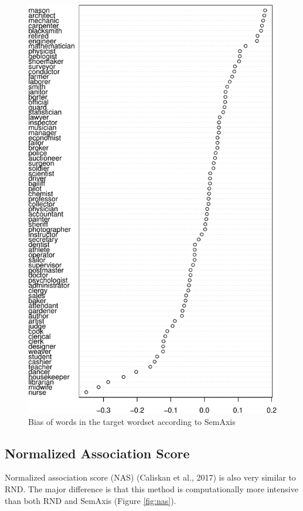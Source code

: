 \documentclass[english,man,mask]{apa6}
\begin{document}
\begin{figure}
\centering
\includegraphics{ica_files/figure-latex/semaxis-1.pdf}
\caption{\label{fig:semaxis}Bias of words in the target wordset according to SemAxis}
\end{figure}

\hypertarget{normalized-association-score}{%
\subsection{Normalized Association Score}\label{normalized-association-score}}

Normalized association score (NAS) (Caliskan et al., 2017) is also very similar to RND. The major difference is that this method is computationally more intensive than both RND and SemAxis (Figure \ref{fig:nas}).
\end{document}
